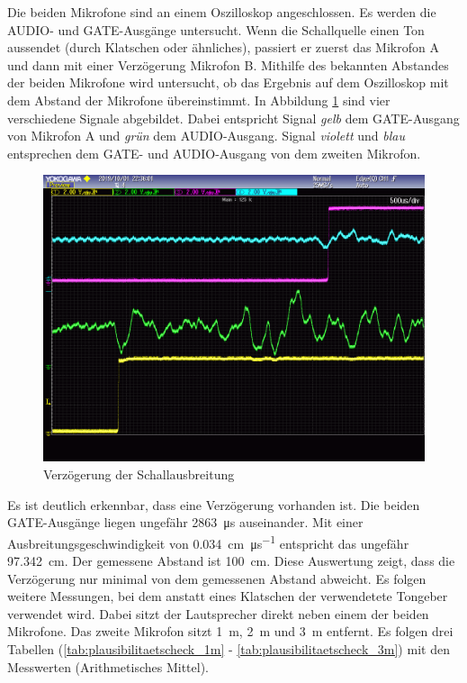 Die beiden Mikrofone sind an einem Oszilloskop angeschlossen. Es werden die \si{AUDIO}- und \si{GATE}-Ausgänge untersucht. Wenn die Schallquelle einen Ton aussendet (durch Klatschen oder ähnliches), passiert er zuerst das Mikrofon A und dann mit einer Verzögerung Mikrofon B. Mithilfe des bekannten Abstandes der beiden Mikrofone wird untersucht, ob das Ergebnis auf dem Oszilloskop mit dem Abstand der Mikrofone übereinstimmt. In Abbildung \ref{img:plausibilitaetscheck_oszi} sind vier verschiedene Signale abgebildet. Dabei entspricht Signal \textit{gelb} dem \si{GATE}-Ausgang von Mikrofon A und \textit{grün} dem \si{AUDIO}-Ausgang. Signal \textit{violett} und \textit{blau} entsprechen dem \si{GATE}- und \si{AUDIO}-Ausgang von dem zweiten Mikrofon.

\begin{figure}[H]
        \centering
        \hspace*{-1.9cm}
        \includegraphics[width=1.2\textwidth]{images/plausibilitaetscheck_oszi.png}
        \caption{Verzögerung der Schallausbreitung}
        \label{img:plausibilitaetscheck_oszi}
\end{figure}

Es ist deutlich erkennbar, dass eine Verzögerung vorhanden ist. Die beiden \si{GATE}-Ausgänge liegen ungefähr \SI{2863}{\micro \second} auseinander. Mit einer Ausbreitungsgeschwindigkeit von \SI{0,034}{\centi\metre\per\micro\second} entspricht das ungefähr \SI{97,342}{\centi\metre}. Der gemessene Abstand ist \SI{100}{\centi\metre}. Diese Auswertung zeigt, dass die Verzögerung nur minimal von dem gemessenen Abstand abweicht. Es folgen weitere Messungen, bei dem anstatt eines Klatschen der verwendetete Tongeber verwendet wird. Dabei sitzt der Lautsprecher direkt neben einem der beiden Mikrofone. Das zweite Mikrofon sitzt \SI{1}{\metre}, \SI{2}{\metre} und \SI{3}{\metre} entfernt. Es folgen drei Tabellen (\ref{tab:plausibilitaetscheck_1m} - \ref{tab:plausibilitaetscheck_3m}) mit den Messwerten (Arithmetisches Mittel).

